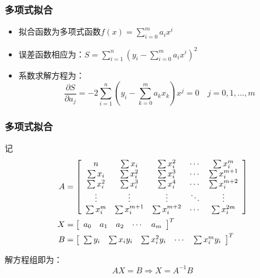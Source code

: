 \documentclass[red,compress]{beamer}
\begin{document}
\begin{frame}
\frametitle{多项式拟合}
\begin{itemize}
\item
拟合函数为多项式函数$f(x)=\sum_{i=0}^{m}a_ix^i$

\item
误差函数相应为：$S=\sum_{i=1}^{n}(y_i-\sum_{i=0}^{m}a_ix^i)^2$

\item
系数求解方程为：
\begin{equation*}
\frac{\partial S}{\partial a_j}=-2\sum_{i=1}^{n}(y_i-\sum_{k=0}^{m}a_kx_k)x^j=0 \quad j = 0,1,...,m 
\end{equation*}

\end{itemize}


\end{frame}


\begin{frame}
\frametitle{多项式拟合}
记
\begin{align*}
A&=\left[
\begin{array}{*{5}c}
n & \sum x_i & \sum x_i^2 & \cdots & \sum x_i^m \\
\sum x_i & \sum x_i^2 & \sum x_i^3 & \cdots & \sum x_i^{m+1} \\
\sum x_i^2 & \sum x_i^3 & \sum x_i^4 & \cdots & \sum x_i^{m+2} \\
\vdots & \vdots & \vdots & \ddots & \vdots \\
\sum x_i^m & \sum x_i^{m+1} & \sum x_i^{m+2} & \cdots & \sum x_i^{2m} 
\end{array}
\right] \\
X &=
\left[
\begin{array}{*{5}c}
a_0 & a_1 & a_2 & \cdots & a_m
\end{array} 
\right]^T\\
B &=
\left[
\begin{array}{*{5}c}
\sum y_i &
\sum x_iy_i &
\sum x_i^2y_i &
\cdots &
\sum x_i^my_i
\end{array}
\right]^T
\end{align*}

解方程组即为：
\begin{equation*}
	AX=B \Rightarrow X=A^{-1}B
\end{equation*}

\end{frame}
\end{document}
